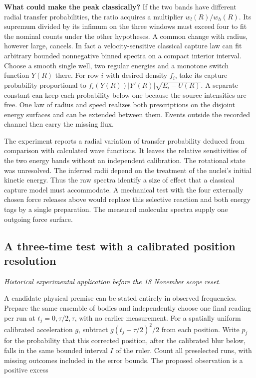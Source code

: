 \documentclass[11pt,a4paper]{article}
\begin{document}
\textbf{What could make the peak classically?} If the two bands have
different radial transfer probabilities, the ratio acquires a multiplier
\(w_l(R)/w_h(R)\). Its supremum divided by its infimum on the three
windows must exceed four to fit the nominal counts under the other
hypotheses. A common change with radius, however large, cancels. In fact
a velocity-sensitive classical capture law can fit arbitrary bounded
nonnegative binned spectra on a compact interior interval. Choose a
smooth single well, two regular energies and a monotone switch function
\(Y(R)\) there. For row \(i\) with desired density \(f_i\), take its
capture probability proportional to \(f_i(Y(R))|Y'(R)|\sqrt{E_i-U(R)}\).
A separate constant can keep each probability below one because the
source intensities are free. One law of radius and speed realizes both
prescriptions on the disjoint energy surfaces and can be extended
between them. Events outside the recorded channel then carry the missing
flux.

The experiment reports a radial variation of transfer probability
deduced from comparison with calculated wave functions. It leaves the
relative sensitivities of the two energy bands without an independent
calibration. The rotational state was unresolved. The inferred radii
depend on the treatment of the nuclei's initial kinetic energy. Thus the
raw spectra identify a size of effect that a classical capture model
must accommodate. A mechanical test with the four externally chosen
force releases above would replace this selective reaction and both
energy tags by a single preparation. The measured molecular spectra
supply one outgoing force surface.

\subsection{A three-time test with a calibrated position
resolution}\label{a-three-time-test-with-a-calibrated-position-resolution}

\emph{Historical experimental application before the 18 November scope
reset.}

A candidate physical premise can be stated entirely in observed
frequencies. Prepare the same ensemble of bodies and independently
choose one final reading per run at \(t_j=0,\tau/2,\tau\), with no
earlier measurement. For a spatially uniform calibrated acceleration
\(g\), subtract \(g(t_j-\tau/2)^2/2\) from each position. Write \(p_j\)
for the probability that this corrected position, after the calibrated
blur below, falls in the same bounded interval \(I\) of the ruler. Count
all preselected runs, with missing outcomes included in the error
bounds. The proposed observation is a positive excess
\end{document}
